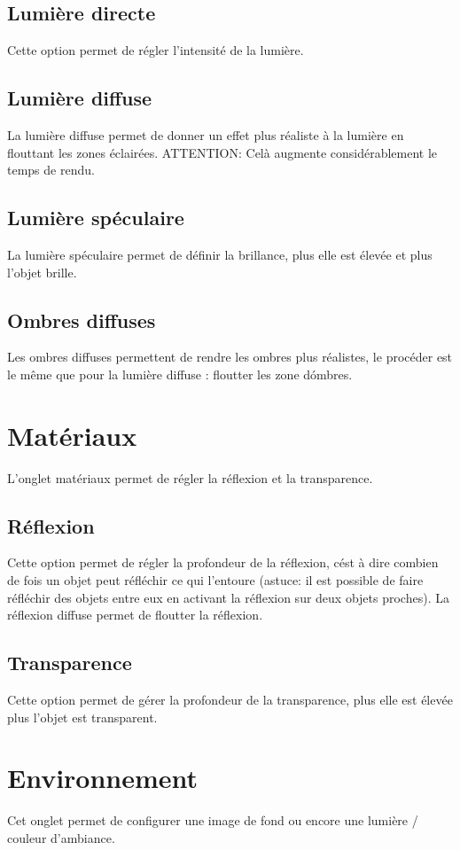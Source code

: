 \documentclass{report}
\begin{document}
\section{Lumi\`ere directe}
Cette option permet de r\'egler l'intensit\'e de la lumi\`ere.
\section{Lumi\`ere diffuse}
La lumi\`ere diffuse permet de donner un effet plus r\'ealiste \`a la lumi\`ere en flouttant les zones \'eclair\'ees.
\newline ATTENTION: Cel\`a augmente consid\'erablement le temps de rendu.
\section{Lumi\`ere sp\'eculaire}
La lumi\`ere sp\'eculaire permet de d\'efinir la brillance, plus elle est \'elev\'ee et plus l'objet brille.
\section{Ombres diffuses}
Les ombres diffuses permettent de rendre les ombres plus r\'ealistes, le proc\'eder est le m\^eme que pour la lumi\`ere diffuse : floutter les zone d\'ombres.
\chapter{Mat\'eriaux}
L'onglet mat\'eriaux permet de r\'egler la r\'eflexion et la transparence.
\section{R\'eflexion}
Cette option permet de r\'egler la profondeur de la r\'eflexion, c\'est \`a dire combien de fois un objet peut r\'efl\'echir ce qui l'entoure (astuce: il est possible de faire r\'efl\'echir des objets entre eux en activant la r\'eflexion sur deux objets proches).
\newline La r\'eflexion diffuse permet de floutter la r\'eflexion.
\section{Transparence}
Cette option permet de g\'erer la profondeur de la transparence, plus elle est \'elev\'ee plus l'objet est transparent.
\chapter{Environnement}
Cet onglet permet de configurer une image de fond ou encore une lumi\`ere / couleur d'ambiance.
\end{document}
